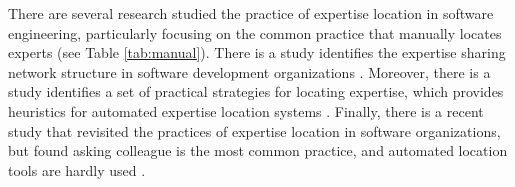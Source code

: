 
There are several research studied the practice of expertise location in software engineering, particularly focusing on the common practice that manually locates experts (see Table \ref{tab:manual}). There is a study identifies the expertise sharing network structure in software development organizations \cite{waterson1997dynamics}. Moreover, there is a study identifies a set of practical strategies for locating expertise, which provides heuristics for automated expertise location systems \cite{mcdonald1998just}. Finally, there is a recent study that revisited the practices of expertise location in software organizations, but found asking colleague is the most common practice, and automated location tools are hardly used \cite{yarosh2013need}.

